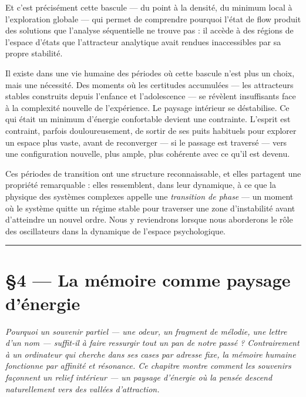 \documentclass[french, 11pt, twoside, openright, a5paper]{book}
\begin{document}
Et c'est précisément cette bascule --- du point à la densité, du minimum
local à l'exploration globale --- qui permet de comprendre pourquoi
l'état de flow produit des solutions que l'analyse séquentielle ne
trouve pas : il accède à des régions de l'espace d'états que
l'attracteur analytique avait rendues inaccessibles par sa propre
stabilité.

Il existe dans une vie humaine des périodes où cette bascule n'est plus
un choix, mais une nécessité. Des moments où les certitudes accumulées
--- les attracteurs stables construits depuis l'enfance et l'adolescence
--- se révèlent insuffisants face à la complexité nouvelle de
l'expérience. Le paysage intérieur se déstabilise. Ce qui était un
minimum d'énergie confortable devient une contrainte. L'esprit est
contraint, parfois douloureusement, de sortir de ses puits habituels
pour explorer un espace plus vaste, avant de reconverger --- si le
passage est traversé --- vers une configuration nouvelle, plus ample,
plus cohérente avec ce qu'il est devenu.

Ces périodes de transition ont une structure reconnaissable, et elles
partagent une propriété remarquable : elles ressemblent, dans leur
dynamique, à ce que la physique des systèmes complexes appelle une
\emph{transition de phase} --- un moment où le système quitte un régime
stable pour traverser une zone d'instabilité avant d'atteindre un nouvel
ordre. Nous y reviendrons lorsque nous aborderons le rôle des
oscillateurs dans la dynamique de l'espace psychologique.

\begin{center}\rule{0.5\linewidth}{0.5pt}\end{center}

\cleardoublepage
\chapter*{§4 --- La mémoire comme paysage d'énergie}
\label{la-memoire-comme-paysage-d-energie}

\emph{Pourquoi un souvenir partiel --- une odeur, un fragment de mélodie, une lettre d'un nom --- suffit-il à faire ressurgir tout un pan de notre passé ? Contrairement à un ordinateur qui cherche dans ses cases par adresse fixe, la mémoire humaine fonctionne par affinité et résonance. Ce chapitre montre comment les souvenirs façonnent un relief intérieur --- un paysage d'énergie où la pensée descend naturellement vers des vallées d'attraction.}
\end{document}
